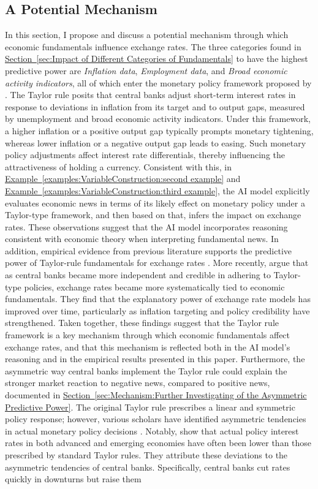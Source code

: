 \documentclass[12pt,oneside,letter]{article}
\newcommand*{\myexmpl}[1]{\hyperref[{#1}]{Example~\ref*{#1}}}
\newcommand*{\mysec}[1]{\hyperref[{#1}]{Section~\ref*{#1}}}
\begin{document}
		\subsection{A Potential Mechanism}
		In this section, I propose and discuss a potential mechanism through which economic fundamentals influence exchange rates. The three categories found in \mysec{sec:Impact of Different Categories of Fundamentals} to have the highest predictive power are \textit{Inflation data}, \textit{Employment data}, and \textit{Broad economic activity indicators}, all of which enter the monetary policy framework proposed by \citet{TAYLOR:1993}. The Taylor rule posits that central banks adjust short-term interest rates in response to deviations in inflation from its target and to output gaps, measured by unemployment and broad economic activity indicators. Under this framework, a higher inflation or a positive output gap typically prompts monetary tightening, whereas lower inflation or a negative output gap leads to easing. Such monetary policy adjustments affect interest rate differentials, thereby influencing the attractiveness of holding a currency. Consistent with this, in \myexmpl{examples:VariableConstruction:second example} and \myexmpl{examples:VariableConstruction:third example}, the AI model explicitly evaluates economic news in terms of its likely effect on monetary policy under a Taylor-type framework, and then based on that, infers the impact on exchange rates. These observations suggest that the AI model incorporates reasoning consistent with economic theory when interpreting fundamental news. In addition, empirical evidence from previous literature supports the predictive power of Taylor-rule fundamentals for exchange rates \citep{CLARIDA/WALDMAN:2007, MOLODTSOVA/PAPELL:2009}. More recently, \citet{ENGLE/WU:2024} argue that as central banks became more independent and credible in adhering to Taylor-type policies, exchange rates became more systematically tied to economic fundamentals. They find that the explanatory power of exchange rate models has improved over time, particularly as inflation targeting and policy credibility have strengthened. Taken together, these findings suggest that the Taylor rule framework is a key mechanism through which economic fundamentals affect exchange rates, and that this mechanism is reflected both in the AI model’s reasoning and in the empirical results presented in this paper. Furthermore, the asymmetric way central banks implement the Taylor rule could explain the stronger market reaction to negative news, compared to positive news, documented in \mysec{sec:Mechanism:Further Investigating of the Asymmetric Predictive Power}. The original Taylor rule prescribes a linear and symmetric policy response; however, various scholars have identified asymmetric tendencies in actual monetary policy decisions \citep{DOLADO/ETAL:2004, BRUGGEMANN/RIEDEL:2011, KOMLAN:2013}. Notably, \citet{HOFMANN/BOGDANOVA:2012} show that actual policy interest rates in both advanced and emerging economies have often been lower than those prescribed by standard Taylor rules. They attribute these deviations to the asymmetric tendencies of central banks. Specifically, central banks cut rates quickly in downturns but raise them 
\end{document}
